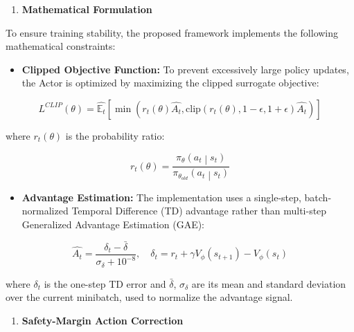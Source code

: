 \documentclass[conference]{IEEEtran}
\begin{document}
\begin{enumerate}
\def\labelenumi{\arabic{enumi})}
\item
  \textbf{Mathematical Formulation}
\end{enumerate}

To ensure training stability, the proposed framework implements the following mathematical constraints:

\begin{itemize}
\item
  \textbf{Clipped Objective Function:} To prevent excessively large policy updates, the Actor is optimized by maximizing the clipped surrogate objective:
\end{itemize}

\begin{equation}\label{eq:13}
L^{CLIP}(\theta) = \widehat{\mathbb{E}_{t}}\left\lbrack \min\left( r_{t}(\theta)\widehat{A_{t}},\text{clip}\left( r_{t}(\theta),1 - \epsilon,1 + \epsilon \right)\widehat{A_{t}} \right) \right\rbrack
\end{equation}

where \(r_{t}(\theta)\) is the probability ratio:

\begin{equation}\label{eq:14}
r_{t}(\theta) = \frac{\pi_{\theta}\left( a_{t} \middle| s_{t} \right)}{\pi_{\theta_{old}}\left( a_{t} \middle| s_{t} \right)}
\end{equation}

\begin{itemize}
\item
  \textbf{Advantage Estimation:} The implementation uses a single-step, batch-normalized Temporal Difference (TD) advantage rather than multi-step Generalized Advantage Estimation (GAE):
\end{itemize}

\begin{equation}\label{eq:15}
\widehat{A_{t}} = \frac{\delta_{t} - \bar{\delta}}{\sigma_{\delta} + 10^{-8}},\quad \delta_{t} = r_{t} + \gamma V_{\phi}\left( s_{t + 1} \right) - V_{\phi}\left( s_{t} \right)
\end{equation}

where \(\delta_{t}\) is the one-step TD error and \(\bar{\delta}\), \(\sigma_{\delta}\) are its mean and standard deviation over the current minibatch, used to normalize the advantage signal.

\begin{enumerate}
\def\labelenumi{\arabic{enumi})}
\setcounter{enumi}{2}
\item
  \textbf{Safety-Margin Action Correction}
\end{enumerate}
\end{document}
